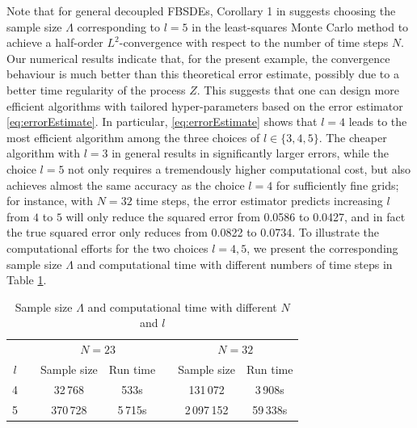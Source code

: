 \documentclass[11pt]{article}
\numberwithin{equation}{section}
\theoremstyle{definition}
\theoremstyle{remark}
\begin{document}
Note that for general decoupled FBSDEs,
Corollary 1 in \cite{gobet2006} suggests  choosing the sample size $\Lambda$ corresponding to $l=5$  
in the least-squares Monte Carlo method
to achieve a half-order  $L^2$-convergence with respect to the number of time steps $N$.
Our numerical results indicate that,
for the present example,
the convergence behaviour is  much better    than this theoretical error estimate,
possibly  due to a better time regularity of the process $Z$.
This suggests that one can design more efficient algorithms 
with tailored hyper-parameters
based on the error estimator \eqref{eq:errorEstimate}.
In particular, 
 \eqref{eq:errorEstimate}
 shows that 
 $l=4$ leads to  the most efficient  algorithm  among the three choices of $l\in \{3,4,5\}$.
The cheaper algorithm with $l=3$ in general 
results in  significantly larger errors,
while
the choice $l=5$
not only requires a tremendously higher computational cost,
but also
achieves  almost the same  
accuracy as   the choice  $l=4$
 for  sufficiently fine grids;
for instance, with $N=32$ time steps, the error estimator predicts increasing $l$ from $4$ to $5$
will only reduce the squared error 
from 0.0586 to 0.0427,
and in fact  the true squared error only reduces
from 0.0822 to 0.0734.
To illustrate the computational efforts  for the two choices $l=4,5$,
we present the 
corresponding
 sample size $\Lambda$
and  computational time
  with different numbers of time steps
in Table \ref{table:compare}.



\begin{table}[H]
 \renewcommand{\arraystretch}{1.05} 
\centering
\caption{ Sample size $\Lambda$ and computational time with different $N$ and $l$}
\label{table:compare}
\begin{tabular}[t]{@{}c c cc c cc@{}}
\toprule
 & \phantom{a}&  
 \multicolumn{2}{c}{$N=23$} &  \phantom{a}&  
 \multicolumn{2}{c}{$N=32$} \\
 \cmidrule{3-4} \cmidrule{6-7}
 $l$ & & Sample size  &   Run time & & Sample size &   Run time\\ \midrule
4 & & 32\,768  & 533s & & 	131\,072	& 3\,908s \\ 
5 & &  370\,728  & 5\,715s & & 	2\,097\,152	& 59\,338s \\ 
\bottomrule
\end{tabular}
\end{table}%
 
\end{document}
